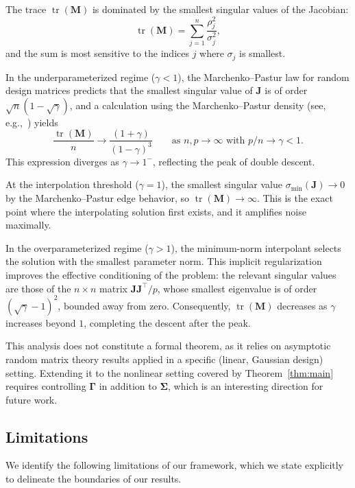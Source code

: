 \documentclass[12pt]{amsart}
\theoremstyle{definition}
\theoremstyle{remark}
\DeclareMathOperator{\tr}{tr}
\newcommand{\bJ}{\mathbf{J}}
\newcommand{\bM}{\mathbf{M}}
\begin{document}
The trace $\tr(\bM)$ is dominated by the smallest singular values of the
Jacobian:
\begin{equation}\label{eq:trM-dom}
  \tr(\bM) = \sum_{j=1}^{n} \frac{\rho_{j}^{2}}{\sigma_{j}^{2}},
\end{equation}
and the sum is most sensitive to the indices $j$ where $\sigma_{j}$ is smallest.

In the underparameterized regime ($\gamma < 1$), the Marchenko--Pastur law for
random design matrices predicts that the smallest singular value of $\bJ$ is of
order $\sqrt{n}(1 - \sqrt{\gamma})$, and a calculation using the Marchenko--Pastur
density (see, e.g.,~\cite[Section~4]{HMRT2022}) yields
\begin{equation}
  \frac{\tr(\bM)}{n} \to \frac{(1 + \gamma)}{(1 - \gamma)^{3}}
  \qquad \text{as } n, p \to \infty \text{ with } p/n \to \gamma < 1.
\end{equation}
This expression diverges as $\gamma \to 1^{-}$, reflecting the peak of double
descent.

At the interpolation threshold ($\gamma = 1$), the smallest singular value
$\sigma_{\min}(\bJ) \to 0$ by the Marchenko--Pastur edge behavior, so
$\tr(\bM) \to \infty$.  This is the exact point where the interpolating solution
first exists, and it amplifies noise maximally.

In the overparameterized regime ($\gamma > 1$), the minimum-norm interpolant
selects the solution with the smallest parameter norm.  This implicit
regularization improves the effective conditioning of the problem: the relevant
singular values are those of the $n \times n$ matrix $\bJ\bJ^{\top}/p$, whose
smallest eigenvalue is of order $(\sqrt{\gamma} - 1)^{2}$, bounded away from
zero.  Consequently, $\tr(\bM)$ decreases as $\gamma$ increases beyond $1$,
completing the descent after the peak.

This analysis does not constitute a formal theorem, as it relies on asymptotic
random matrix theory results applied in a specific (linear, Gaussian design)
setting.  Extending it to the nonlinear setting covered by
Theorem~\ref{thm:main} requires controlling $\boldsymbol{\Gamma}$ in addition to
$\boldsymbol{\Sigma}$, which is an interesting direction for future work.

\subsection{Limitations}\label{subsec:limitations}

We identify the following limitations of our framework, which we state explicitly
to delineate the boundaries of our results.
\end{document}
